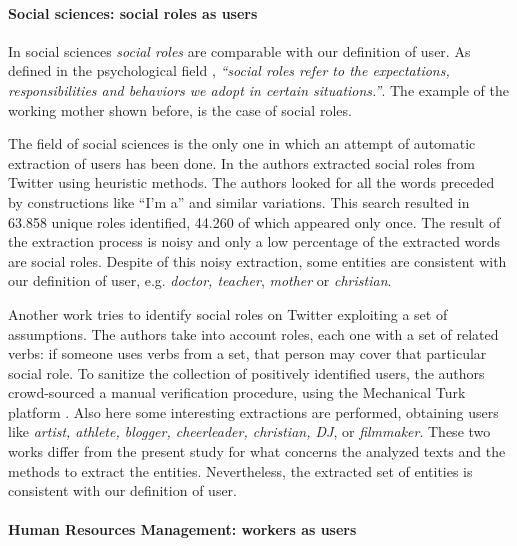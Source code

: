 \documentclass[]{book}
\let\oldparagraph\paragraph
\renewcommand{\paragraph}[1]{\oldparagraph{#1}\mbox{}}
\begin{document}
\paragraph{Social sciences: social roles as
users}\label{social-sciences-social-roles-as-users}

In social sciences \emph{social roles} are comparable with our
definition of user. As defined in the psychological field
\citep{alleydog}, \emph{``social roles refer to the expectations,
responsibilities and behaviors we adopt in certain situations.''}. The
example of the working mother shown before, is the case of social roles.

The field of social sciences is the only one in which an attempt of
automatic extraction of users has been done. In \citep{belieber} the
authors extracted social roles from Twitter using heuristic methods. The
authors looked for all the words preceded by constructions like ``I'm
a'' and similar variations. This search resulted in 63.858 unique roles
identified, 44.260 of which appeared only once. The result of the
extraction process is noisy and only a low percentage of the extracted
words are social roles. Despite of this noisy extraction, some entities
are consistent with our definition of user, e.g. \emph{doctor, teacher},
\emph{mother} or \emph{christian}.

Another work \citep{prefine} tries to identify social roles on Twitter
exploiting a set of assumptions. The authors take into account roles,
each one with a set of related verbs: if someone uses verbs from a set,
that person may cover that particular social role. To sanitize the
collection of positively identified users, the authors crowd-sourced a
manual verification procedure, using the Mechanical Turk platform
\citep{kittur2008crowdsourcing}. Also here some interesting extractions
are performed, obtaining users like \emph{artist, athlete, blogger,
cheerleader, christian, DJ}, or \emph{filmmaker}. These two works differ
from the present study for what concerns the analyzed texts and the
methods to extract the entities. Nevertheless, the extracted set of
entities is consistent with our definition of user.

\paragraph{Human Resources Management: workers as
users}\label{human-resources-management-workers-as-users}
\end{document}
